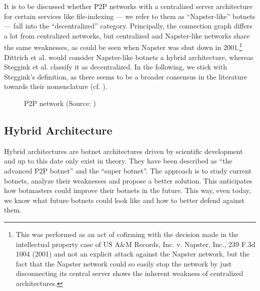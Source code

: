 \documentclass{llncs}
\begin{document}
It is to be discussed whether P2P networks with a centralized server
architecture for certain services like file-indexing --- we refer to
them as ``Napster-like'' botnets --- fall into the ``decentralized''
category. Principally, the connection graph differs a lot from
centralized networks, but centralized and Napster-like networks share
the same weaknesses, as could be seen when Napster was shut down in
2001\cite{napsterWiki}.\footnote{This was performed as an act of
  cofirming with the decision made in the intellectual property case
  of US A&M Records, Inc. v. Napster, Inc., 239 F.3d 1004 (2001) and
  not an explicit attack against the Napster network, but the fact
  that the Napster network could so easily stop the network by just
  disconnecting its central server shows the inherent weakness of
  centralized architectures.}  Dittrich et
al. \cite{dittrich2007command} would consider Napster-like botnets a
hybrid architecture, whereas Steggink et al.
\cite{steggink2007detection} classify it as decentralized. In the
following, we stick with Steggink's definition, as there seems to be a
broader consensus in the literature towards their nomenclature
(cf. \cite{td1sc}).

\begin{figure}[htbp]
  \centering
  \caption{P2P network (Source: \cite{dittrich2007command})}
  \label{p2p-network}
\end{figure}


\subsection{Hybrid Architecture}
Hybrid architectures are botnet architectures driven by scientific
development and up to this date only exist in theory. They have been
described as ``the advanced P2P botnet''\cite{td1sc} and the ``super
botnet''\cite{vogt2007army}. The approach is to study current botnets,
analyze their weaknesses and propose a better solution. This
anticipates how botmasters could improve their botnets in the
future. This way, even today, we know what future botnets could look
like and how to better defend against them.
\end{document}
